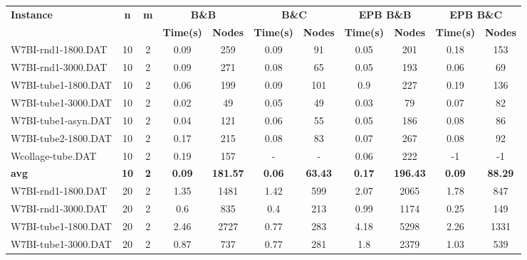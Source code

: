 \begin{table}[!ht]
\centering
\hspace*{-1cm}\begin{tabular}{lcccccccccc}
\toprule
\textbf{Instance} & \textbf{n} & \textbf{m} & \multicolumn{2}{c}{\textbf{B\&B}} & \multicolumn{2}{c}{\textbf{B\&C}}  & \multicolumn{2}{c}{\textbf{EPB B\&B}} & \multicolumn{2}{c}{\textbf{EPB B\&C}} \\

\cmidrule(r){4-5} \cmidrule(r){6-7} \cmidrule(r){8-9} \cmidrule(r){10-11} 
~ & ~ & ~ & \textbf{Time(s)} &\textbf{Nodes} & \textbf{Time(s)} &\textbf{Nodes} & \textbf{Time(s)} &\textbf{Nodes} & \textbf{Time(s)} &\textbf{Nodes}  \\
\midrule

W7BI-rnd1-1800.DAT & 10 & 2 & 0.09 & 259 & 0.09 & 91 &  \textcolor{blue2}{0.05} & 201 & 0.18 & 153 \\
W7BI-rnd1-3000.DAT & 10 & 2 & 0.09 & 271 & 0.08 & 65 &  \textcolor{blue2}{0.05} & 193 & 0.06 & 69 \\
W7BI-tube1-1800.DAT & 10 & 2 &  \textcolor{blue2}{0.06} & 199 & 0.09 & 101 & 0.9 & 227 & 0.19 & 136 \\
W7BI-tube1-3000.DAT & 10 & 2 &  \textcolor{blue2}{0.02} & 49 & 0.05 & 49 & 0.03 & 79 & 0.07 & 82 \\
W7BI-tube1-asyn.DAT & 10 & 2 &  \textcolor{blue2}{0.04} & 121 & 0.06 & 55 & 0.05 & 186 & 0.08 & 86 \\
W7BI-tube2-1800.DAT & 10 & 2 & 0.17 & 215 & 0.08 & 83 &  \textcolor{blue2}{0.07} & 267 & 0.08 & 92 \\
Wcollage-tube.DAT & 10 & 2 & 0.19 & 157 &  - &  - &  \textcolor{blue2}{0.06} & 222 & -1 & -1 \\
\cline{1-11} \textbf{avg} & \textbf{10} & \textbf{2} & \textbf{0.09} & \textbf{181.57} & \textbf{0.06} & \textbf{63.43} & \textbf{0.17} & \textbf{196.43} & \textbf{0.09} & \textbf{88.29} \\ \cline{1-11}
W7BI-rnd1-1800.DAT & 20 & 2 &  \textcolor{blue2}{1.35} & 1481 & 1.42 & 599 & 2.07 & 2065 & 1.78 & 847 \\
W7BI-rnd1-3000.DAT & 20 & 2 & 0.6 & 835 & 0.4 & 213 & 0.99 & 1174 &  \textcolor{blue2}{0.25} & 149 \\
W7BI-tube1-1800.DAT & 20 & 2 & 2.46 & 2727 &  \textcolor{blue2}{0.77} & 283 & 4.18 & 5298 & 2.26 & 1331 \\
W7BI-tube1-3000.DAT & 20 & 2 & 0.87 & 737 &  \textcolor{blue2}{0.77} & 281 & 1.8 & 2379 & 1.03 & 539 \\

\end{tabular}
\end{table}
